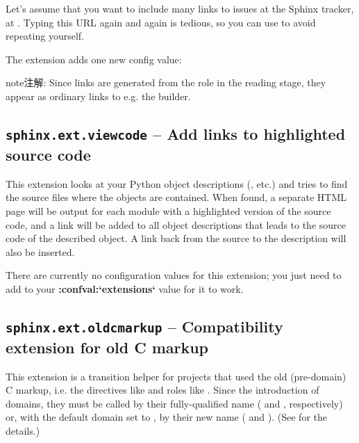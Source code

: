 \documentclass[letterpaper,10pt,english]{sphinxmanual}
\begin{document}
Let's assume that you want to include many links to issues at the Sphinx
tracker, at .  Typing
this URL again and again is tedious, so you can use {\hyperref[ext/extlinks:module\string-sphinx.ext.extlinks]{}}
to avoid repeating yourself.

The extension adds one new config value:

\begin{notice}{note}{注解:}
Since links are generated from the role in the reading stage, they appear as
ordinary links to e.g. the  builder.
\end{notice}


\subsection{\texttt{sphinx.ext.viewcode} -- Add links to highlighted source code}
\label{ext/viewcode:sphinx-ext-viewcode-add-links-to-highlighted-source-code}\label{ext/viewcode:module-sphinx.ext.viewcode}\label{ext/viewcode::doc}

This extension looks at your Python object descriptions (,
 etc.) and tries to find the source files where the objects are
contained.  When found, a separate HTML page will be output for each module with
a highlighted version of the source code, and a link will be added to all object
descriptions that leads to the source code of the described object.  A link back
from the source to the description will also be inserted.

There are currently no configuration values for this extension; you just need to
add  to your {\color{red}\bfseries{}:confval:{}`extensions{}`} value for it to work.


\subsection{\texttt{sphinx.ext.oldcmarkup} -- Compatibility extension for old C markup}
\label{ext/oldcmarkup:sphinx-ext-oldcmarkup-compatibility-extension-for-old-c-markup}\label{ext/oldcmarkup:module-sphinx.ext.oldcmarkup}\label{ext/oldcmarkup::doc}

This extension is a transition helper for projects that used the old
(pre-domain) C markup, i.e. the directives like  and roles like
.  Since the introduction of domains, they must be called by their
fully-qualified name ( and , respectively) or, with the
default domain set to , by their new name ( and ).
(See {\hyperref[domains:c\string-domain]{}} for the details.)
\end{document}
